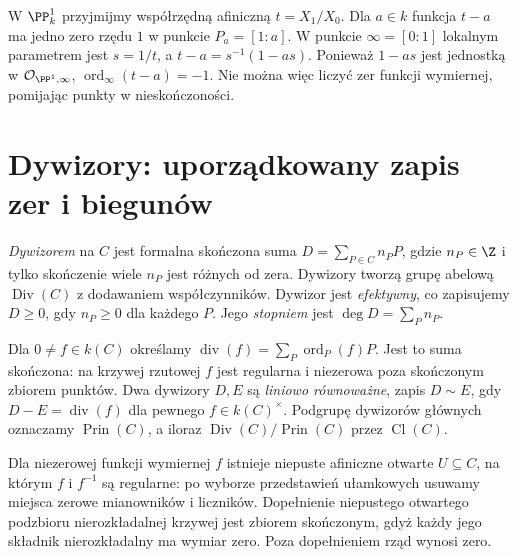 \begin{przyklad}
W $\PP^1_k$ przyjmijmy współrzędną afiniczną
$t=X_1/X_0$. Dla $a\in k$ funkcja $t-a$ ma
jedno zero rzędu $1$ w punkcie $P_a=[1:a]$.
W punkcie $\infty=[0:1]$ lokalnym parametrem jest
$s=1/t$, a $t-a=s^{-1}(1-as)$.
Ponieważ $1-as$ jest jednostką w $\mathcal O_{\PP^1,\infty}$,
$\operatorname{ord}_\infty(t-a)=-1$.
Nie można więc liczyć zer funkcji wymiernej,
pomijając punkty w nieskończoności.
\end{przyklad}

\section{Dywizory: uporządkowany zapis zer i biegunów}
\label{sec:divisors}

\begin{definicja}
\emph{Dywizorem} na $C$ jest formalna skończona suma
$D=\sum_{P\in C}n_P P$, gdzie $n_P\in\Z$
i tylko skończenie wiele $n_P$ jest różnych od zera.
Dywizory tworzą grupę abelową $\operatorname{Div}(C)$
z dodawaniem współczynników. Dywizor jest
\emph{efektywny}, co zapisujemy $D\ge0$,
gdy $n_P\ge0$ dla każdego $P$.
Jego \emph{stopniem} jest $\deg D=\sum_Pn_P$.
\end{definicja}

\begin{definicja}
Dla $0\ne f\in k(C)$ określamy
$\operatorname{div}(f)=\sum_P\operatorname{ord}_P(f)P$.
Jest to suma skończona: na krzywej rzutowej
$f$ jest regularna i niezerowa poza skończonym
zbiorem punktów. Dwa dywizory $D,E$ są
\emph{liniowo równoważne}, zapis $D\sim E$,
gdy $D-E=\operatorname{div}(f)$ dla pewnego
$f\in k(C)^\times$. Podgrupę dywizorów głównych
oznaczamy $\operatorname{Prin}(C)$, a iloraz
$\operatorname{Div}(C)/\operatorname{Prin}(C)$
przez $\operatorname{Cl}(C)$.
\end{definicja}

\begin{uwaga}
Dla niezerowej funkcji wymiernej $f$ istnieje niepuste
afiniczne otwarte $U\subseteq C$, na którym $f$
i $f^{-1}$ są regularne: po wyborze przedstawień
ułamkowych usuwamy miejsca zerowe mianowników
i liczników. Dopełnienie niepustego otwartego
podzbioru nierozkładalnej krzywej jest zbiorem
skończonym, gdyż każdy jego składnik nierozkładalny
ma wymiar zero. Poza dopełnieniem rząd wynosi zero.
\end{uwaga}

